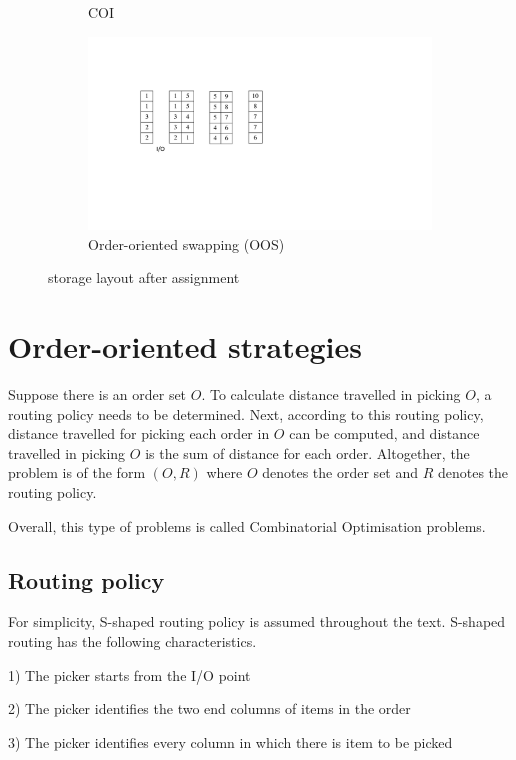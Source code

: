 \documentclass[hyp]{socreport}
\begin{document}
\begin{figure}
\begin{subfigure}{.5\textwidth}
	\centering
	\caption{COI}
	\label{fig1.3:c}
\end{subfigure}
\begin{subfigure}{.5\textwidth}
	\includegraphics[scale=0.5]{ifh-oos}
	\centering
	\caption{Order-oriented swapping (OOS)}
	\label{fig1.3:d}
\end{subfigure}
\caption{storage layout after assignment}
\label{fig:variouslayouts}
\end{figure}

\section{Order-oriented strategies}
\label{sectionQAP}
Suppose there is an order set $O$. To calculate distance travelled in picking $O$, a routing policy needs to be determined. Next, according to this routing policy, distance travelled for picking each order in $O$ can be computed, and distance travelled in picking $O$ is the sum of distance for each order. Altogether, the problem is of the form $(O,R)$ where $O$ denotes the order set and $R$ denotes the routing policy.

Overall, this type of problems is called Combinatorial Optimisation problems.
\subsection{Routing policy}
For simplicity, S-shaped routing policy is assumed throughout the text. S-shaped routing has the following characteristics.

1) The picker starts from the I/O point

2) The picker identifies the two end columns of items in the order

3) The picker identifies every column in which there is item to be picked
\end{document}
